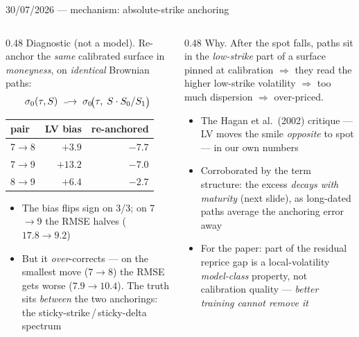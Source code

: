 \documentclass[aspectratio=169,11pt]{beamer}
\newcommand{\gold}[1]{{\color{ntugold}#1}}
\newcommand{\red}[1]{{\color{ntured}#1}}
\begin{document}
\begin{frame}{30/07/2026 --- mechanism: absolute-strike anchoring}
  \begin{columns}[T]
    \begin{column}{0.48\linewidth}
      \gold{Diagnostic (not a model).} Re-anchor the \emph{same} calibrated surface in
      \emph{moneyness}, on \emph{identical} Brownian paths:
      \[\scriptsize
        \sigma_0(\tau,S)\;\longrightarrow\;\sigma_0\!\big(\tau,\;S\cdot S_0/S_1\big)
      \]
      \begin{center}\scriptsize
      \begin{tabular}{lrr}
        \toprule
        pair & LV bias & re-anchored \\
        \midrule
        7$\to$8 & $+3.9$ & \red{$-7.7$} \\
        7$\to$9 & $+13.2$ & \red{$-7.0$} \\
        8$\to$9 & $+6.4$ & \red{$-2.7$} \\
        \bottomrule
      \end{tabular}
      \end{center}
      \begin{itemize}\scriptsize
        \item \red{The bias flips sign on 3/3}; on 7$\to$9 the RMSE halves ($17.8\to9.2$)
        \item But it \emph{over}-corrects --- on the smallest move (7$\to$8) the RMSE gets
              \gold{worse} ($7.9\to10.4$). The truth sits \emph{between} the two
              anchorings: the sticky-strike\,/\,sticky-delta spectrum
      \end{itemize}
    \end{column}
    \begin{column}{0.48\linewidth}
      \gold{Why.} After the spot falls, paths sit in the \emph{low-strike} part of a
      surface pinned at calibration $\Rightarrow$ they read the higher low-strike
      volatility $\Rightarrow$ too much dispersion $\Rightarrow$ over-priced.
      \begin{itemize}\scriptsize
        \item The \gold{Hagan et al.\ (2002)} critique --- LV moves the smile
              \emph{opposite} to spot --- in our own numbers
        \item Corroborated by the term structure: the excess \emph{decays with maturity}
              (next slide), as long-dated paths average the anchoring error away
        \item \red{For the paper}: part of the residual reprice gap is a
              local-volatility \emph{model-class} property, not calibration quality ---
              \emph{better training cannot remove it}
      \end{itemize}
    \end{column}
  \end{columns}
\end{frame}
\end{document}
